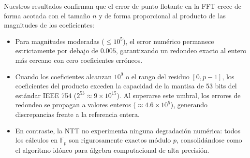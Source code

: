 Nuestros resultados confirman que el error de punto flotante en la FFT crece de forma acotada con el tamaño $n$ y de forma proporcional al producto de las magnitudes de los coeficientes:
\begin{itemize}
    \item Para magnitudes moderadas ($\le 10^5$), el error numérico permanece estrictamente por debajo de $0.005$, garantizando un redondeo exacto al entero más cercano con cero coeficientes erróneos.
    \item Cuando los coeficientes alcanzan $10^9$ o el rango del residuo $[0, p-1]$, los coeficientes del producto exceden la capacidad de la mantisa de 53 bits del estándar IEEE 754 ($2^{53} \approx 9 \times 10^{15}$). Al superarse este umbral, los errores de redondeo se propagan a valores enteros ($\approx 4.6 \times 10^5$), generando discrepancias frente a la referencia entera.
    \item En contraste, la NTT no experimenta ninguna degradación numérica: todos los cálculos en $\mathbb{F}_p$ son rigurosamente exactos módulo $p$, consolidándose como el algoritmo idóneo para álgebra computacional de alta precisión.
\end{itemize}
